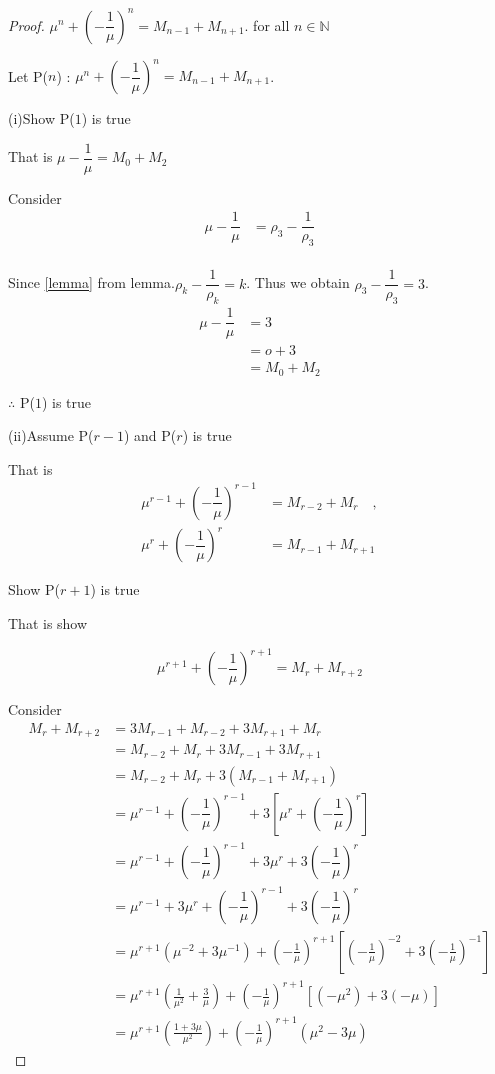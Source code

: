 \documentclass{rmutt-seminar}
\begin{document}
\begin{proof}
$\mu^n + \left(-\dfrac{1}{\mu}\right)^n = M_{n-1} + M_{n+1} $. for all $n \in \mathbb{N}$

\quad Let P($n$) : $\mu^n + \left(-\dfrac{1}{\mu}\right)^n = M_{n-1} + M_{n+1} $. 

\quad (i)\quad Show P($1$) is true 

\quad \quad \quad That is $\mu -\dfrac{1}{\mu} = M_{0} + M_{2} $ 

\quad \quad \quad Consider
\begin{align*}
 	\mu - \dfrac{1}{\mu} &= \rho_3 - \dfrac{1}{\rho_3}\\
 \end{align*}
 
\quad \quad \quad Since \eqref{lemma} from lemma.\quad $\rho_k-\dfrac{1}{\rho_k}=k$. Thus we obtain $\rho_3-\dfrac{1}{\rho_3}=3$.
 \begin{align*}
 	\mu - \dfrac{1}{\mu} &= 3\\
 	&= o + 3\\
 	&= M_{0} + M_{2}
 \end{align*}
 
\quad \quad \quad $\therefore$ P($1$) is true
 
\quad (ii)\quad Assume P($r-1$) and P($r$) is true

\quad \quad \quad That is 
\begin{align*}
	\mu^{r-1} + \left(-\dfrac{1}{\mu}\right)^{r-1} &= M_{r-2} + M_{r} \quad, \\
	\mu^{r} + \left(-\dfrac{1}{\mu}\right)^{r} &= M_{r-1} + M_{r+1}
\end{align*}

\quad \quad \quad Show P($r+1$) is true
 
\quad \quad \quad That is show 
 
$$ \mu^{r+1} + \left(-\dfrac{1}{\mu}\right)^{r+1}= M_{r} + M_{r+2} $$

\quad \quad \quad Consider
\begin{align*}
	M_{r} + M_{r+2} &= 3M_{r-1} + M_{r-2} + 3M_{r+1} + M_r \\
	&= M_{r-2} + M_r + 3M_{r-1} + 3M_{r+1} \\ 
	&= M_{r-2} + M_r + 3(M_{r-1} + M_{r+1}) \\
	&= \mu^{r-1} + \left(-\dfrac{1}{\mu}\right)^{r-1} +3\left[\mu^{r} + \left(-\dfrac{1}{\mu}\right)^{r}\right] \\
	&= \mu^{r-1} + \left(-\dfrac{1}{\mu}\right)^{r-1} +3\mu^{r} + 3\left(-\dfrac{1}{\mu}\right)^{r}\ \\
	&= \mu^{r-1}+3\mu^{r}  + \left(-\dfrac{1}{\mu}\right)^{r-1} + 3\left(-\dfrac{1}{\mu}\right)^{r}\ \\
	&= \mu^{r+1}(\mu^{-2} + 3\mu^{-1}) + \left(-\frac{1}{\mu}\right)^{r+1} \left[ \left(-\frac{1}{\mu}\right)^{-2} + 3\left(-\frac{1}{\mu}\right)^{-1}\right] \\
	&= \mu^{r+1} \left(\frac{1}{\mu^2} + \frac{3}{\mu}\right) + \left(-\frac{1}{\mu}\right)^{r+1}[(-\mu^2)+3(-\mu)] \\
	&= \mu^{r+1}\left(\frac{1+3\mu}{\mu^2}\right)+\left(-\frac{1}{\mu}\right)^{r+1}(\mu^2-3\mu)
\end{align*}


\end{proof}
\end{document}
